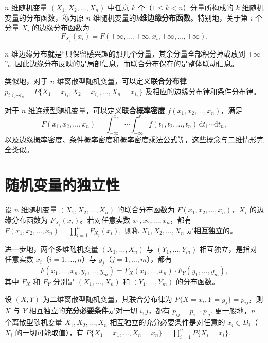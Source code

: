 \documentclass[lang=cn,11pt]{elegantbook}
\begin{document}
\begin{definition}[$n$维边缘分布函数]\label{def:n-marginal-df}
$n$ 维随机变量 $(X_1, X_2, \dots, X_n)$ 中任意 $k$ 个（$1 \leqslant k < n$）分量所构成的 $k$ 维随机变量的分布函数，称为原 $n$ 维随机变量的\textbf{$k$维边缘分布函数}。特别地，关于第 $i$ 个分量 $X_i$ 的边缘分布函数为
\[
F_{X_i}(x_i) = F(+\infty, \dots, +\infty, x_i, +\infty, \dots, +\infty).
\]
\end{definition}

\begin{note}
$n$ 维边缘分布就是“只保留感兴趣的那几个分量，其余分量全部积分掉或放到 $+\infty$”。因此边缘分布反映的是局部信息，而联合分布保存的是整体联动信息。
\end{note}

类似地，对于 $n$ 维离散型随机变量，可以定义\textbf{联合分布律} \(p_{i_1 i_2 \cdots i_n} = P\{X_1 = x_{i_1}, X_2 = x_{i_2}, \dots, X_n = x_{i_n}\}\) 及相应的边缘分布律和条件分布律。

对于 $n$ 维连续型随机变量，可以定义\textbf{联合概率密度} $f(x_1, x_2, \dots, x_n)$，满足
\[
F(x_1, x_2, \dots, x_n) = \int_{-\infty}^{x_n}\cdots\int_{-\infty}^{x_1}f(t_1, t_2, \dots, t_n)\,\mathrm{d}t_1\cdots\mathrm{d}t_n,
\]
以及边缘概率密度、条件概率密度和概率密度乘法公式等，这些概念与二维情形完全类似。

\section{随机变量的独立性}

\begin{definition}[$n$ 个随机变量的相互独立性] \label{def:n-independence}
设 $n$ 维随机变量 $(X_1, X_2, \dots, X_n)$ 的联合分布函数为 $F(x_1, x_2, \dots, x_n)$，$X_i$ 的边缘分布函数为 $F_{X_i}(x_i)$。若对任意实数 $x_1, x_2, \dots, x_n$，都有
\(
F(x_1, x_2, \dots, x_n) = \prod_{i=1}^{n}F_{X_i}(x_i),
\)
则称 $X_1, X_2, \dots, X_n$ 是\textbf{相互独立}的。

进一步地，两个多维随机变量 $(X_1, \dots, X_n)$ 与 $(Y_1, \dots, Y_m)$ 相互独立，是指对任意实数 $x_i$（$i=1,\dots,n$）与 $y_j$（$j=1,\dots,m$），都有
\[
F(x_1, \dots, x_n, y_1, \dots, y_m) = F_X(x_1, \dots, x_n) \cdot F_Y(y_1, \dots, y_m),
\]
其中 $F_X$ 和 $F_Y$ 分别是 $(X_1, \dots, X_n)$ 和 $(Y_1, \dots, Y_m)$ 的分布函数。
\end{definition}

\begin{theorem}[离散型随机变量独立的判定]\label{thm:discrete-independence}
设 $(X,Y)$ 为二维离散型随机变量，其联合分布律为 $P\{X = x_i, Y = y_j\} = p_{ij}$，则 $X$ 与 $Y$ 相互独立的\textbf{充分必要条件}是对一切 $i, j$，都有
\(
p_{ij} = p_{i\cdot} \cdot p_{\cdot j}.
\)
更一般地，$n$ 个离散型随机变量 $X_1, X_2, \dots, X_n$ 相互独立的充分必要条件是对任意的 $x_i \in D_i$（$X_i$ 的一切可能取值），有
\(
P\{X_1 = x_1, \dots, X_n = x_n\} = \prod_{i=1}^{n}P\{X_i = x_i\}.
\)
\end{theorem}
\end{document}
